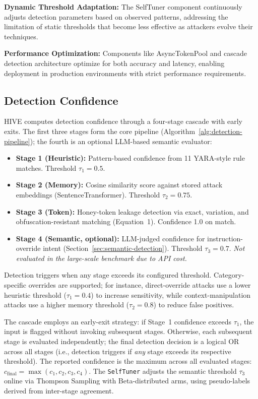 \documentclass[manuscript,screen,review]{acmart}
\begin{document}
\textbf{Dynamic Threshold Adaptation:} The SelfTuner component continuously adjusts detection parameters based on observed patterns, addressing the limitation of static thresholds that become less effective as attackers evolve their techniques.

\textbf{Performance Optimization:} Components like AsyncTokenPool and cascade detection architecture optimize for both accuracy and latency, enabling deployment in production environments with strict performance requirements.

\subsection{Detection Confidence}
\label{sec:detection-confidence}
HIVE computes detection confidence through a four-stage cascade with early exits. The first three stages form the core pipeline (Algorithm~\ref{alg:detection-pipeline}); the fourth is an optional LLM-based semantic evaluator:
\begin{itemize}
\item \textbf{Stage 1 (Heuristic):} Pattern-based confidence from 11 YARA-style rule matches. Threshold $\tau_1 = 0.5$.
\item \textbf{Stage 2 (Memory):} Cosine similarity score against stored attack embeddings (SentenceTransformer). Threshold $\tau_2 = 0.75$.
\item \textbf{Stage 3 (Token):} Honey-token leakage detection via exact, variation, and obfuscation-resistant matching (Equation~1). Confidence 1.0 on match.
\item \textbf{Stage 4 (Semantic, optional):} LLM-judged confidence for instruction-override intent (Section~\ref{sec:semantic-detection}). Threshold $\tau_3 = 0.7$. \emph{Not evaluated in the large-scale benchmark due to API cost.}
\end{itemize}
Detection triggers when any stage exceeds its configured threshold. Category-specific overrides are supported; for instance, direct-override attacks use a lower heuristic threshold ($\tau_1 = 0.4$) to increase sensitivity, while context-manipulation attacks use a higher memory threshold ($\tau_2 = 0.8$) to reduce false positives.

The cascade employs an early-exit strategy: if Stage~1 confidence exceeds $\tau_1$, the input is flagged without invoking subsequent stages. Otherwise, each subsequent stage is evaluated independently; the final detection decision is a logical OR across all stages (i.e., detection triggers if \emph{any} stage exceeds its respective threshold). The reported confidence is the maximum across all evaluated stages: $c_{\text{final}} = \max(c_1, c_2, c_3, c_4)$. The \texttt{SelfTuner} adjusts the semantic threshold $\tau_3$ online via Thompson Sampling with Beta-distributed arms, using pseudo-labels derived from inter-stage agreement.
\end{document}

